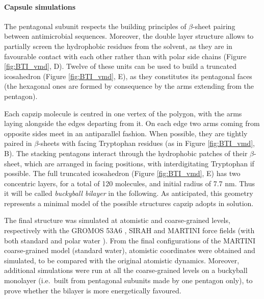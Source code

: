 \paragraph{Capsule simulations} The pentagonal subunit respects the building principles of $\beta$-sheet pairing between antimicrobial sequences. Moreover, the double layer structure allows to partially screen the hydrophobic residues from the solvent, as they are in favourable contact with each other rather than with polar side chains (Figure \ref{fig:BTI_vmd}, D).
%
Twelve of these units can be used to build a truncated icosahedron (Figure \ref{fig:BTI_vmd}, E), as they constitutes its pentagonal faces (the hexagonal ones are formed by consequence by the arms extending from the pentagon).

Each capzip molecule is centred in one vertex of the polygon, with the arms laying alongside the edges departing from it. On each edge two arms coming from opposite sides meet in an antiparallel fashion. When possible, they are tightly paired in $\beta$-sheets with facing Tryptophan residues (as in Figure \ref{fig:BTI_vmd}, B). The stacking pentagons interact through the hydrophobic patches of their $\beta$-sheet, which are arranged in facing positions, with interdigitating Tryptophan if possible.
%
The full truncated icosahedron (Figure \ref{fig:BTI_vmd}, E) has two concentric layers, for a total of 120 molecules, and initial radius of 7.7 nm. Thus it will be called \emph{buckyball bilayer} in the following.
%
As anticipated, this geometry represents a minimal model of the possible structures capzip adopts in solution.

The final structure was simulated at atomistic and coarse-grained levels, respectively with the GROMOS 53A6 \citep{Oostenbrink2004}, SIRAH \citep{Machado2018} and MARTINI \citep{Marrink2007, Monticelli2008} force fields (with both standard and polar water \citep{Yesylevskyy2010}).
From the final configurations of the MARTINI coarse-grained model (standard water), atomistic coordinates were obtained and simulated, to be compared with the original atomistic dynamics.
%
Moreover, additional simulations were run at all the coarse-grained levels on a buckyball monolayer (i.e.\ built from pentagonal subunits made by one pentagon only), to prove whether the bilayer is more energetically favoured.

